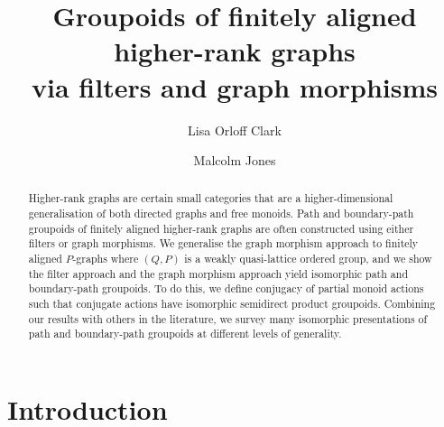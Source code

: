 \documentclass[11pt]{amsart}
\theoremstyle{definition}
\numberwithin{thm}{section}
\numberwithin{equation}{section}
\begin{document}
\title[
    Groupoids of finitely aligned higher-rank graphs
]{
    Groupoids of finitely aligned higher-rank graphs \\
    via filters and graph morphisms
}

\author[L. O. Clark]{Lisa Orloff Clark}
\address[L. O. Clark]{
    School of Mathematics and Statistics,
    Victoria University of Wellington,
    PO Box 600,
    Wellington 6140,
    New Zealand
}

\author[M. Jones]{Malcolm Jones}
\address[M. Jones]{
    Institute of Mathematics, Physics and Mechanics,
    Ljubljana 1000,
    Slovenia
}

\begin{abstract}
Higher-rank graphs are certain small categories that are a higher-dimensional generalisation of both directed graphs and free monoids.
Path and boundary-path groupoids of finitely aligned higher-rank graphs are often constructed using either filters or graph morphisms. 
We generalise the graph morphism approach to finitely aligned $P$-graphs where $(Q, P)$ is a weakly quasi-lattice ordered group, and we show the filter approach and the graph morphism approach yield isomorphic path and boundary-path groupoids. 
To do this, we define conjugacy of partial monoid actions such that conjugate actions have isomorphic semidirect product groupoids. 
Combining our results with others in the literature, we survey many isomorphic presentations of path and boundary-path groupoids at different levels of generality.
\end{abstract}

\maketitle

\section{Introduction}
\end{document}
